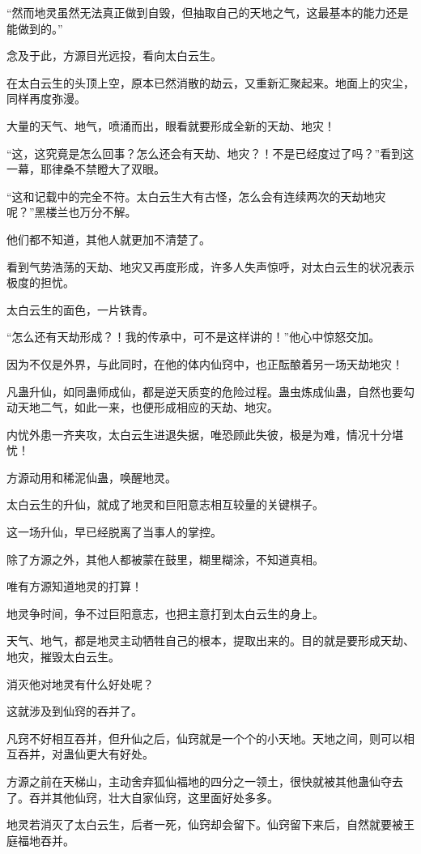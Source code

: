 \begin{this_body}
“然而地灵虽然无法真正做到自毁，但抽取自己的天地之气，这最基本的能力还是能做到的。”

念及于此，方源目光远投，看向太白云生。

在太白云生的头顶上空，原本已然消散的劫云，又重新汇聚起来。地面上的灾尘，同样再度弥漫。

大量的天气、地气，喷涌而出，眼看就要形成全新的天劫、地灾！

“这，这究竟是怎么回事？怎么还会有天劫、地灾？！不是已经度过了吗？”看到这一幕，耶律桑不禁瞪大了双眼。

“这和记载中的完全不符。太白云生大有古怪，怎么会有连续两次的天劫地灾呢？”黑楼兰也万分不解。

他们都不知道，其他人就更加不清楚了。

看到气势浩荡的天劫、地灾又再度形成，许多人失声惊呼，对太白云生的状况表示极度的担忧。

太白云生的面色，一片铁青。

“怎么还有天劫形成？！我的传承中，可不是这样讲的！”他心中惊怒交加。

因为不仅是外界，与此同时，在他的体内仙窍中，也正酝酿着另一场天劫地灾！

凡蛊升仙，如同蛊师成仙，都是逆天质变的危险过程。蛊虫炼成仙蛊，自然也要勾动天地二气，如此一来，也便形成相应的天劫、地灾。

内忧外患一齐夹攻，太白云生进退失据，唯恐顾此失彼，极是为难，情况十分堪忧！

方源动用和稀泥仙蛊，唤醒地灵。

太白云生的升仙，就成了地灵和巨阳意志相互较量的关键棋子。

这一场升仙，早已经脱离了当事人的掌控。

除了方源之外，其他人都被蒙在鼓里，糊里糊涂，不知道真相。

唯有方源知道地灵的打算！

地灵争时间，争不过巨阳意志，也把主意打到太白云生的身上。

天气、地气，都是地灵主动牺牲自己的根本，提取出来的。目的就是要形成天劫、地灾，摧毁太白云生。

消灭他对地灵有什么好处呢？

这就涉及到仙窍的吞并了。

凡窍不好相互吞并，但升仙之后，仙窍就是一个个的小天地。天地之间，则可以相互吞并，对蛊仙更大有好处。

方源之前在天梯山，主动舍弃狐仙福地的四分之一领土，很快就被其他蛊仙夺去了。吞并其他仙窍，壮大自家仙窍，这里面好处多多。

地灵若消灭了太白云生，后者一死，仙窍却会留下。仙窍留下来后，自然就要被王庭福地吞并。


\end{this_body}

